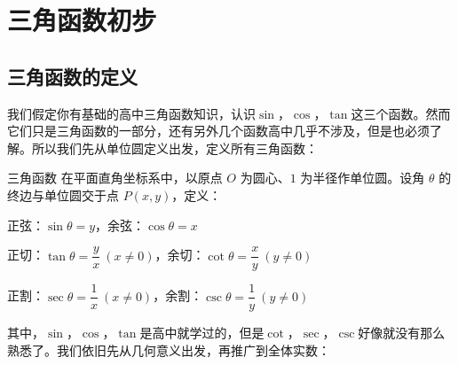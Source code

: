 \section{三角函数初步}


\subsection{三角函数的定义}
我们假定你有基础的高中三角函数知识，认识\(\sin\)，\(\cos\)，\(\tan\)这三个函数。然而它们只是三角函数的一部分，还有另外几个函数高中几乎不涉及，但是也必须了解。所以我们先从单位圆定义出发，定义所有三角函数：

\begin{definition}{三角函数}{}
在平面直角坐标系中，以原点 $O$ 为圆心、$1$ 为半径作单位圆。设角 $\theta$ 的终边与单位圆交于点 $P(x, y)$，定义：

\begin{center}
正弦：\(\sin\theta = y\)，\quad 余弦：\(\cos\theta = x\)
\end{center}

\begin{center}
正切：\(\tan\theta = \dfrac{y}{x}\ (x \neq 0)\)，\quad 余切：\(\cot\theta = \dfrac{x}{y}\ (y \neq 0)\)
\end{center}

\begin{center}
正割：\(\sec\theta = \dfrac{1}{x}\ (x \neq 0)\)，\quad 余割：\(\csc\theta = \dfrac{1}{y}\ (y \neq 0)\)
\end{center}

\end{definition}

其中，\(\sin\)，\(\cos\)，\(\tan\)是高中就学过的，但是\(\cot\)，\(\sec\)，\(\csc\)好像就没有那么熟悉了。我们依旧先从几何意义出发，再推广到全体实数：

